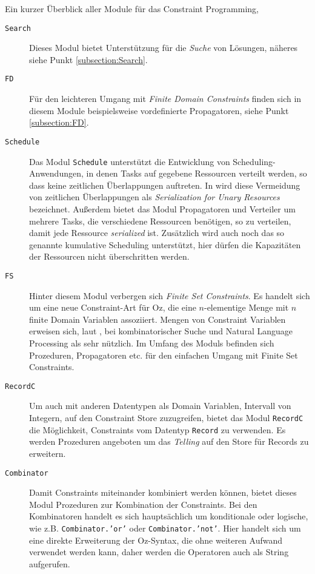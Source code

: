 Ein kurzer Überblick aller Module für das Constraint Programming,
\begin{description}
  \item[\texttt{Search}] Dieses Modul bietet Unterstützung für die \textsl{Suche} von
  Lösungen, näheres siehe Punkt \ref{subsection:Search}. 
  
  \item[\texttt{FD}] Für den leichteren Umgang mit \textit{Finite Domain Constraints}
  finden sich in diesem Module beispielsweise vordefinierte Propagatoren, siehe
  Punkt \ref{subsection:FD}.
  
  \item[\texttt{Schedule}] Das Modul \texttt{Schedule} unterstützt die
  Entwicklung von Scheduling-Anwendung\-en, in denen Tasks auf gegebene Ressourcen
  verteilt werden, so dass keine zeitlichen Überlappungen auftreten. In
  \cite[System Modules, Part II]{url:mozart-documentation} wird diese
  Vermeidung von zeitlichen
  Überlappungen als \textsl{Serialization for Unary Resources} bezeichnet.
  Außerdem bietet das Modul Propagatoren und Verteiler um mehrere Tasks, die
  verschiedene Ressourcen benötigen, so zu verteilen, damit jede Ressource
  \textsl{serialized} ist. Zusätzlich wird auch noch das so genannte kumulative
  Scheduling unterstützt, hier dürfen die Kapazitäten der Ressourcen nicht
  überschritten werden.
  
  \item[\texttt{FS}] Hinter diesem Modul verbergen sich \textsl{Finite Set
  Constraints}. Es handelt sich um eine neue Constraint-Art für Oz, die eine
  $n$-elementige Menge mit $n$ finite Domain Variablen assoziiert. Mengen von
  Constraint Variablen erweisen sich, laut \cite[System Modules, Part
  II]{url:mozart-documentation}, bei
  kombinatorischer Suche und Natural Language Processing als sehr nützlich. Im
  Umfang des Moduls befinden sich Prozeduren, Propagatoren etc. für den
  einfachen Umgang mit Finite Set Constraints.
  
  \item[\texttt{RecordC}] Um auch mit anderen Datentypen als Domain Variablen,
  Intervall von Integern, auf den Constraint Store zuzugreifen, bietet das
  Modul \texttt{RecordC} die Möglichkeit, Constraints vom Datentyp
  \texttt{Record} zu verwenden. Es werden Prozeduren angeboten um das
  \textsl{Telling} auf den Store für Records zu erweitern.
  
  \item[\texttt{Combinator}] Damit Constraints miteinander kombiniert werden
  können, bietet dieses Modul Prozeduren zur Kombination der Constraints. Bei den
  Kombinatoren handelt es sich hauptsächlich um konditionale oder logische, wie
  z.B. \texttt{Combinator.'or'} oder \texttt{Combinator.'not'}. Hier handelt
  sich um eine direkte Erweiterung der Oz-Syntax, die ohne weiteren Aufwand
  verwendet werden kann, daher werden die Operatoren auch als String aufgerufen.
  

\end{description}
